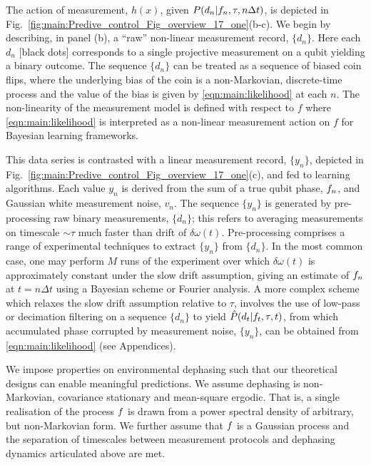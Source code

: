 \documentclass[pra, reprint]{revtex4-1}
\begin{document}
The action of measurement, $h(x)$, given $P(d_n | f_n, \tau, n \Delta t)$, is depicted in Fig.~\ref{fig:main:Predive_control_Fig_overview_17_one}(b-c).  We begin by describing, in panel (b), a ``raw'' non-linear measurement record, $\{ d_n\}$.  Here each $d_n$ [black dots] corresponds to a single projective measurement on a qubit yielding a binary outcome. The sequence $\{ d_n\}$ can be treated as a sequence of biased coin flips, where the underlying bias of the coin is a non-Markovian, discrete-time process and the value of the bias is given by \cref{eqn:main:likelihood} at each $n$. The non-linearity of the measurement model is defined with respect to $f$ where \cref{eqn:main:likelihood} is interpreted as a non-linear measurement action on $f$ for Bayesian learning frameworks.

This data series is contrasted with a linear measurement record, $\{ y_n\}$, depicted in Fig.~\ref{fig:main:Predive_control_Fig_overview_17_one}(c), and fed to learning algorithms.  Each value $y_n$ is derived from the sum of a true qubit phase, $f_n$, and Gaussian white measurement noise, $v_n$.  The sequence $\{ y_n\}$ is generated by pre-processing raw binary measurements, $\{ d_n\}$; this refers to averaging measurements on timescale $\sim\tau$ much faster than drift of $\delta \omega (t)$. Pre-processing comprises a range of experimental techniques to extract $\{ y_n\}$ from $\{ d_n\}$. In the most common case, one may perform $M$ runs of the experiment over which $\delta \omega (t)$ is approximately constant under the slow drift assumption, giving an estimate of  $f_n$ at $t = n \Delta t $ using a Bayesian scheme or Fourier analysis. A more complex scheme which relaxes the slow drift assumption relative to $\tau$, involves the use of low-pass or decimation filtering on a sequence $\{ d_n\}$  to yield $\hat{P}(d_t | f_t, \tau, t)$, from which accumulated phase corrupted by measurement noise, $\{ y_n\}$, can be obtained from \cref{eqn:main:likelihood} (see Appendices). 

We impose properties on environmental dephasing such that our theoretical designs can enable meaningful predictions. We assume dephasing is non-Markovian, covariance stationary and mean-square ergodic.  That is, a single realisation of the process $f$ is drawn from a power spectral density of arbitrary, but non-Markovian form. We further assume that $f$ is a Gaussian process and the separation of timescales between measurement protocols and dephasing dynamics articulated above are met.
\end{document}
